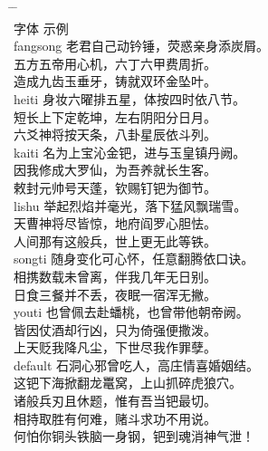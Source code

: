 \begin{tabbing}
\hspace{20mm} \= \hspace{20mm} \= \hspace{80mm} \kill\\
 \> 字体      \>  \hspace{26mm} 示例 \\
 \> fangsong \> \fangsong 老君自己动钤锤，荧惑亲身添炭屑。 \\
 \>          \> \fangsong 五方五帝用心机，六丁六甲费周折。 \\
 \>          \> \fangsong 造成九齿玉垂牙，铸就双环金坠叶。 \\
 \> heiti    \> \heiti 身妆六曜排五星，体按四时依八节。 \\
 \>          \> \heiti 短长上下定乾坤，左右阴阳分日月。 \\
 \>          \> \heiti 六爻神将按天条，八卦星辰依斗列。 \\
 \> kaiti    \> \kaiti 名为上宝沁金钯，进与玉皇镇丹阙。 \\
 \>          \> \kaiti 因我修成大罗仙，为吾养就长生客。 \\
 \>          \> \kaiti 敕封元帅号天蓬，钦赐钉钯为御节。 \\
 \> lishu    \> \lishu 举起烈焰并毫光，落下猛风飘瑞雪。 \\
 \>          \> \lishu 天曹神将尽皆惊，地府阎罗心胆怯。 \\
 \>          \> \lishu 人间那有这般兵，世上更无此等铁。 \\
 \> songti   \> \songti 随身变化可心怀，任意翻腾依口诀。 \\
 \>          \> \songti 相携数载未曾离，伴我几年无日别。 \\
 \>          \> \songti 日食三餐并不丢，夜眠一宿浑无撇。 \\
 \> youti    \> \youti 也曾佩去赴蟠桃，也曾带他朝帝阙。 \\
 \>          \> \youti 皆因仗酒却行凶，只为倚强便撒泼。 \\
 \>          \> \youti 上天贬我降凡尘，下世尽我作罪孽。 \\
 \> default  \> 石洞心邪曾吃人，高庄情喜婚姻结。 \\
 \>          \> 这钯下海掀翻龙鼍窝，上山抓碎虎狼穴。 \\
 \>          \> 诸般兵刃且休题，惟有吾当钯最切。 \\
 \>          \> 相持取胜有何难，赌斗求功不用说。 \\
 \>          \> 何怕你铜头铁脑一身钢，钯到魂消神气泄！
\end{tabbing}

